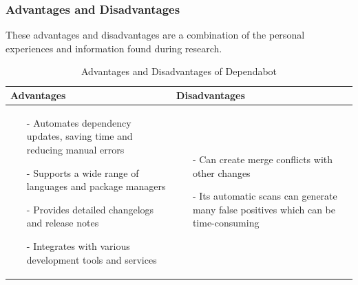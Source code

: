 \subsubsection{Advantages and Disadvantages}
These advantages and disadvantages are a combination of the personal experiences and information found during research. \cite{prosconsdependabot} 

\begin{table}[H]
\centering
\begin{tabular}{|>{\raggedright\arraybackslash}p{6cm}|>{\raggedright\arraybackslash}p{6cm}|}
\hline
\textbf{Advantages} & \textbf{Disadvantages} \\
\hline
\begin{itemize}
\item [-]Automates dependency updates, saving time and reducing manual errors 
\item [-] Supports a wide range of languages and package managers 
\item [-] Provides detailed changelogs and release notes 
\item [-] Integrates with various development tools and services
\end{itemize}
&
\begin{itemize}
\item [-] Can create merge conflicts with other changes 
\item [-] Its automatic scans can generate many false positives which can be time-consuming
\end{itemize}
\\
\hline
\end{tabular}
\caption{Advantages and Disadvantages of Dependabot}
\label{tab:dependabot}
\end{table}

